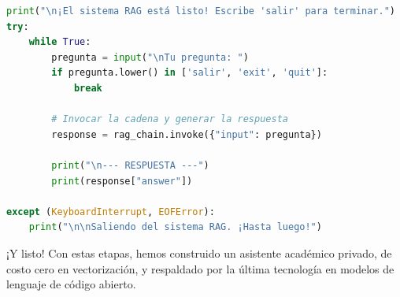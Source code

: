\documentclass[12pt,a4paper]{article}
\begin{document}
\begin{lstlisting}[language=Python]
print("\n¡El sistema RAG está listo! Escribe 'salir' para terminar.")
try:
    while True:
        pregunta = input("\nTu pregunta: ")
        if pregunta.lower() in ['salir', 'exit', 'quit']:
            break
            
        # Invocar la cadena y generar la respuesta
        response = rag_chain.invoke({"input": pregunta})

        print("\n--- RESPUESTA ---")
        print(response["answer"])

except (KeyboardInterrupt, EOFError):
    print("\n\nSaliendo del sistema RAG. ¡Hasta luego!")
\end{lstlisting}

¡Y listo! Con estas etapas, hemos construido un asistente académico privado, de costo cero en vectorización, y respaldado por la última tecnología en modelos de lenguaje de código abierto.
\end{document}
